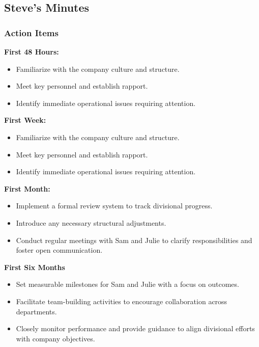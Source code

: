 \documentclass[a4paper,10pt]{article}
\begin{document}
\subsection{Steve's Minutes}
\author{Bahne Thiel-Peters (Julie)}

\subsubsection{Action Items}

\noindent \textbf{First 48 Hours: }
\begin{itemize}
    \item Familiarize with the company culture and structure.
    \item Meet key personnel and establish rapport.
    \item Identify immediate operational issues requiring attention.
\end{itemize}

\noindent \textbf{First Week:}
\begin{itemize}
    \item Familiarize with the company culture and structure.
    \item Meet key personnel and establish rapport.
    \item Identify immediate operational issues requiring attention.
\end{itemize}

\noindent \textbf{First Month:}
\begin{itemize}
    \item Implement a formal review system to track divisional progress.
    \item Introduce any necessary structural adjustments.
    \item Conduct regular meetings with Sam and Julie to clarify responsibilities and foster open communication.
\end{itemize}

\noindent \textbf{First Six Months}
\begin{itemize}
    \item Set measurable milestones for Sam and Julie with a focus on outcomes.
    \item Facilitate team-building activities to encourage collaboration across departments.
    \item Closely monitor performance and provide guidance to align divisional efforts with company objectives.
\end{itemize}
\end{document}
